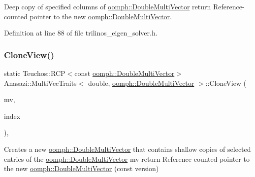 Deep copy of specified columns of \hyperlink{classoomph_1_1DoubleMultiVector}{oomph\+::\+Double\+Multi\+Vector} return Reference-\/counted pointer to the new \hyperlink{classoomph_1_1DoubleMultiVector}{oomph\+::\+Double\+Multi\+Vector}. 



Definition at line 88 of file trilinos\+\_\+eigen\+\_\+solver.\+h.

\mbox{\label{classAnasazi_1_1MultiVecTraits_3_01double_00_01oomph_1_1DoubleMultiVector_01_4_a9f09feafb7d8303d11253186d39104b7}} 
\subsubsection{\texorpdfstring{Clone\+View()}{CloneView()}\hspace{0.1cm}{\footnotesize\ttfamily [1/3]}}
{\footnotesize\ttfamily static Teuchos\+::\+R\+CP$<$const \hyperlink{classoomph_1_1DoubleMultiVector}{oomph\+::\+Double\+Multi\+Vector}$>$ Anasazi\+::\+Multi\+Vec\+Traits$<$ double, \hyperlink{classoomph_1_1DoubleMultiVector}{oomph\+::\+Double\+Multi\+Vector} $>$\+::Clone\+View (\begin{DoxyParamCaption}\item[{const \hyperlink{classoomph_1_1DoubleMultiVector}{oomph\+::\+Double\+Multi\+Vector} \&}]{mv,  }\item[{const std\+::vector$<$ int $>$ \&}]{index }\end{DoxyParamCaption})\hspace{0.3cm}{\ttfamily [inline]}, {\ttfamily [static]}}



Creates a new \hyperlink{classoomph_1_1DoubleMultiVector}{oomph\+::\+Double\+Multi\+Vector} that contains shallow copies of selected entries of the \hyperlink{classoomph_1_1DoubleMultiVector}{oomph\+::\+Double\+Multi\+Vector} mv return Reference-\/counted pointer to the new \hyperlink{classoomph_1_1DoubleMultiVector}{oomph\+::\+Double\+Multi\+Vector} (const version) 



